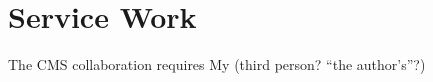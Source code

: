 \chapter{Service Work}
\label{Service Work}

The CMS collaboration requires 
My (third person? ``the author's''?) 